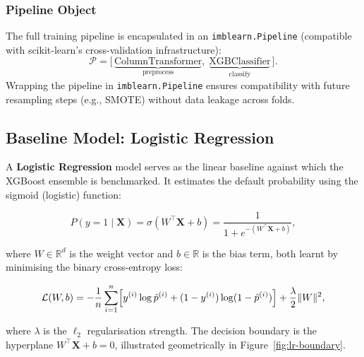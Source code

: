 \documentclass[12pt,a4paper]{article}
\theoremstyle{definition}
\newcommand{\bfmath}[1]{\boldsymbol{#1}}
\begin{document}
\subsubsection{Pipeline Object}

The full training pipeline is encapsulated in an \texttt{imblearn.Pipeline}
(compatible with scikit-learn's cross-validation infrastructure):
\[
  \mathcal{P} = \bigl[\,
    \underbrace{\text{ColumnTransformer}}_{\text{preprocess}},\;
    \underbrace{\text{XGBClassifier}}_{\text{classify}}
  \,\bigr].
\]
Wrapping the pipeline in \texttt{imblearn.Pipeline} ensures compatibility
with future resampling steps (e.g., SMOTE) without data leakage across folds.

\subsection{Baseline Model: Logistic Regression}
\label{sec:lr}

A \textbf{Logistic Regression} model serves as the linear baseline against which
the XGBoost ensemble is benchmarked.  It estimates the default probability using
the sigmoid (logistic) function:

\begin{equation}
  P(y=1 \mid \bfmath{X}) = \sigma\!\left(W^{\top}\bfmath{X} + b\right)
  = \frac{1}{1 + e^{-(W^{\top}\bfmath{X} + b)}},
  \label{eq:sigmoid}
\end{equation}

where $W \in \mathbb{R}^d$ is the weight vector and $b \in \mathbb{R}$ is the
bias term, both learnt by minimising the binary cross-entropy loss:

\begin{equation}
  \mathcal{L}(W, b) = -\frac{1}{n}\sum_{i=1}^{n}
    \Bigl[y^{(i)}\log\hat{p}^{(i)} + (1-y^{(i)})\log(1-\hat{p}^{(i)})\Bigr]
    + \frac{\lambda}{2}\|W\|^2,
  \label{eq:bce}
\end{equation}

where $\lambda$ is the $\ell_2$ regularisation strength.  The decision boundary
is the hyperplane $W^{\top}\bfmath{X} + b = 0$, illustrated geometrically in
Figure~\ref{fig:lr-boundary}.
\end{document}
